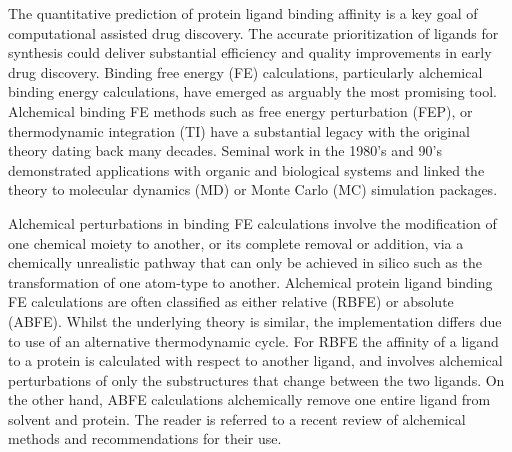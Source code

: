 \documentclass[9pt,bestpractices]{livecoms}
\begin{document}
The quantitative prediction of protein ligand binding affinity is a key goal of computational assisted drug discovery. The accurate prioritization of ligands for synthesis could deliver substantial efficiency and quality improvements in early drug discovery\cite{abelCriticalReviewValidation2017,abelModelingValuePredictive2018}. Binding free energy (FE) calculations, particularly alchemical binding energy calculations, have emerged as arguably the most promising tool\cite{courniaRelativeBindingFree2017}. Alchemical binding FE methods such as free energy perturbation (FEP)\cite{zwanzigHighTemperatureEquation1954,bennettEfficientEstimationFree1976}, or thermodynamic integration (TI)\cite{kirkwoodQuantumStatisticsAlmost1933,kirkwoodQuantumStatisticsAlmost1934,kirkwoodStatisticalMechanicsFluid1935} have a substantial legacy with the original theory dating back many decades. Seminal work in the 1980’s and 90’s demonstrated applications with organic and biological systems and linked the theory to molecular dynamics (MD) or Monte Carlo (MC) simulation packages.\cite{jorgensenMonteCarloSimulation1985,straatsmaFreeEnergyHydrophobic1986,lybrandTheoreticalCalculationRelative1986,merzFreeEnergyPerturbation1989,pearlmanDeterminationDifferentialEffects1995,choderaAlchemicalFreeEnergy2011,mobleyPerspectiveAlchemicalFree2012} 

Alchemical perturbations in binding FE calculations involve the modification of one chemical moiety to another, or its complete removal or addition, via a chemically unrealistic pathway that can only be achieved in silico such as the transformation of one atom-type to another. Alchemical protein ligand binding FE calculations are often classified as either relative (RBFE) or absolute (ABFE). Whilst the underlying theory is similar, the implementation differs due to use of an alternative thermodynamic cycle. For RBFE the affinity of a ligand to a protein is calculated with respect to another ligand, and involves alchemical perturbations of only the substructures that change between the two ligands. On the other hand, ABFE calculations alchemically remove one entire ligand from solvent and protein. The reader is referred to a recent review of alchemical methods and recommendations for their use.\cite{meyBestPracticesAlchemical2020}
\end{document}
